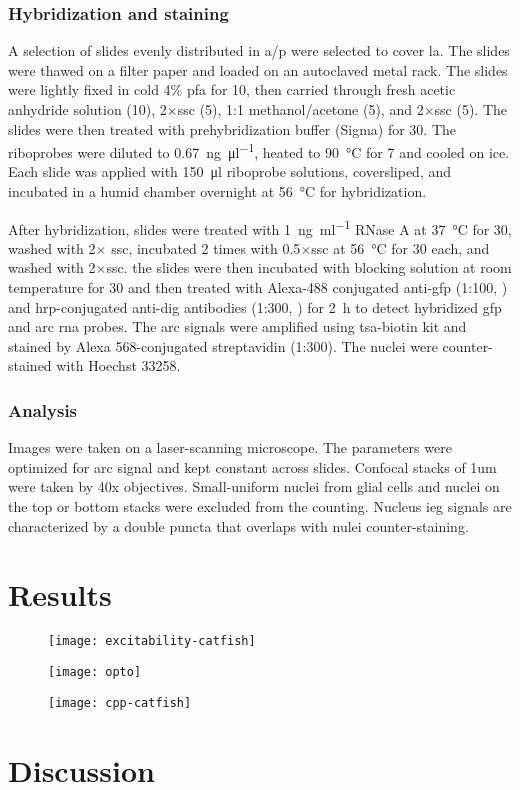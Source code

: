 \subsubsection{Hybridization and staining}
A selection of slides evenly distributed in \gls{a/p} were selected to cover \gls{la}. The slides were thawed on a filter paper and loaded on an autoclaved metal rack. The slides were lightly fixed in cold 4\% \gls{pfa} for \SI{10}{\min}, then carried through fresh acetic anhydride solution (\SI{10}{\min}), 2$\times$\gls{ssc} (\SI{5}{\min}), 1:1 methanol\slash acetone (\SI{5}{\min}), and 2$\times$\gls{ssc} (\SI{5}{\min}). The slides were then treated with prehybridization buffer (Sigma) for \SI{30}{\min}. The riboprobes were diluted to \SI{0.67}{\ng\per\ul}, heated to \SI{90}{\celsius} for \SI{7}{\min} and cooled on ice. Each slide was applied with \SI{150}{\ul} riboprobe solutions, coversliped, and incubated in a humid chamber overnight at \SI{56}{\celsius} for hybridization.

After hybridization, slides were treated with \SI{1}{\ng\per\ml} RNase A at \SI{37}{\celsius} for \SI{30}{\min}, washed with 2$\times$ \gls{ssc}, incubated 2 times with 0.5$\times$\gls{ssc} at \SI{56}{\celsius} for \SI{30}{\min} each, and washed with 2$\times$\gls{ssc}. the slides were then incubated with blocking solution at room temperature for \SI{30}{\min} and then treated with Alexa-488 conjugated anti-\gls{gfp} (1:100, ) and \gls{hrp}-conjugated anti-\gls{dig} antibodies (1:300, ) for \SI{2}{\hour} to detect hybridized \gls{gfp} and \gls{arc} \gls{rna} probes. The \gls{arc} signals were amplified using \gls{tsa}-biotin kit and stained by Alexa 568-conjugated streptavidin (1:300). The nuclei were counter-stained with Hoechst 33258.

\subsubsection{Analysis}
Images were taken on a laser-scanning microscope. The parameters were optimized for \gls{arc} signal and kept constant across slides. Confocal stacks of 1um were taken by 40x objectives. Small-uniform nuclei from glial cells and nuclei on the top or bottom stacks were excluded from the counting. Nucleus \gls{ieg} signals are characterized by a double puncta that overlaps with nulei counter-staining. %

\section{Results}
\begin{figure}[h]
    \texttt{[image: excitability-catfish]}
\end{figure}
\begin{figure}[h]
    \texttt{[image: opto]}
\end{figure}
\begin{figure}[h]
    \texttt{[image: cpp-catfish]}
\end{figure}

\section{Discussion}
